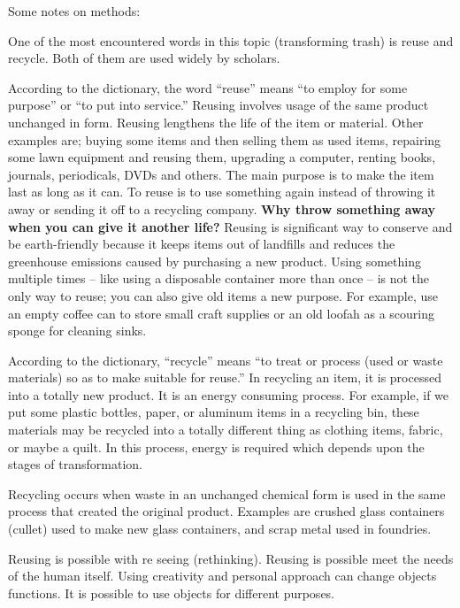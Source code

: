 Some notes on methods: 

One of the most encountered words in this topic (transforming trash) is reuse and recycle. Both of them are used widely by scholars. 

According to the dictionary, the word “reuse” means “to employ for some purpose” or “to put into service.” Reusing involves usage of the same product unchanged in form. Reusing lengthens the life of the item or material. Other examples are; buying some items and then selling them as used items, repairing some lawn equipment and reusing them, upgrading a computer, renting books, journals, periodicals, DVDs and others. The main purpose is to make the item last as long as it can. To reuse is to use something again instead of throwing it away or sending it off to a recycling company. \textbf{Why throw something away when you can give it another life?} Reusing is significant way to conserve and be earth-friendly because it keeps items out of landfills and reduces the greenhouse emissions caused by purchasing a new product. Using something multiple times -- like using a disposable container more than once -- is not the only way to reuse; you can also give old items a new purpose. For example, use an empty coffee can to store small craft supplies or an old loofah as a scouring sponge for cleaning sinks.


According to the dictionary, “recycle” means “to treat or process (used or waste materials) so as to make suitable for reuse.” In recycling an item, it is processed into a totally new product. It is an energy consuming process. For example, if we put some plastic bottles, paper, or aluminum items in a recycling bin, these materials may be recycled into a totally different thing as clothing items, fabric, or maybe a quilt. In this process, energy is required which depends upon the stages of transformation.

Recycling occurs when waste in an unchanged chemical form is used in the same process that created the original product. Examples are crushed glass containers (cullet) used to make new glass containers, and scrap metal used in foundries. 

Reusing is possible with re seeing (rethinking). Reusing is possible meet the needs of the human itself. Using creativity and personal approach can change objects functions. It is possible to use objects for different purposes. 

